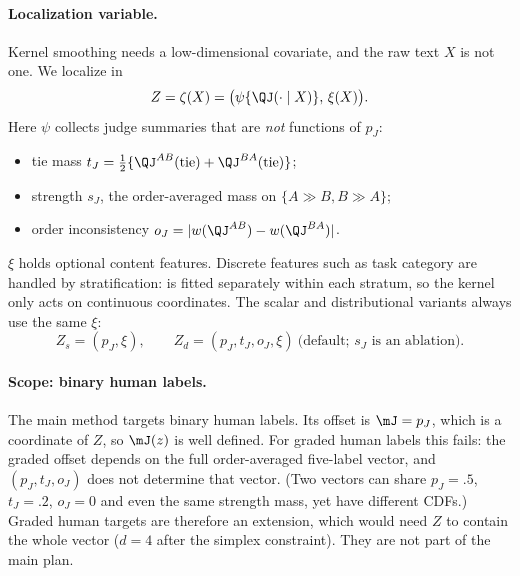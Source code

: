 \paragraph{Localization variable.}
Kernel smoothing needs a low-dimensional covariate, and the raw text $X$ is not one. We localize in
\[
  Z=\zeta(X)=\bigl(\psi\{\QJ(\cdot\mid X)\},\,\xi(X)\bigr).
\]
Here $\psi$ collects judge summaries that are \emph{not} functions of $p_J$:
\begin{itemize}
  \item tie mass $t_J=\tfrac12\{\QJ^{AB}(\text{tie})+\QJ^{BA}(\text{tie})\}$;
  \item strength $s_J$, the order-averaged mass on $\{A\gg B,B\gg A\}$;
  \item order inconsistency $o_J=|w(\QJ^{AB})-w(\QJ^{BA})|$.
\end{itemize}
$\xi$ holds optional content features. Discrete features such as task category are handled by
stratification: \dfsp{} is fitted separately within each stratum, so the kernel only acts on
continuous coordinates. The scalar and distributional variants always use the same $\xi$:
\[
  Z_s=(p_J,\xi),\qquad Z_d=(p_J,t_J,o_J,\xi)\ \text{(default; $s_J$ is an ablation)}.
\]
\paragraph{Scope: binary human labels.}
The main method targets binary human labels. Its offset is $\mJ=p_J$, which is a coordinate of
$Z$, so $\mJ(z)$ is well defined. For graded human labels this fails: the graded offset depends on
the full order-averaged five-label vector, and $(p_J,t_J,o_J)$ does not determine that vector. (Two
vectors can share $p_J=.5$, $t_J=.2$, $o_J=0$ and even the same strength mass, yet have different
CDFs.) Graded human targets are therefore an extension, which would need $Z$ to contain the whole
vector ($d=4$ after the simplex constraint). They are not part of the main plan.

